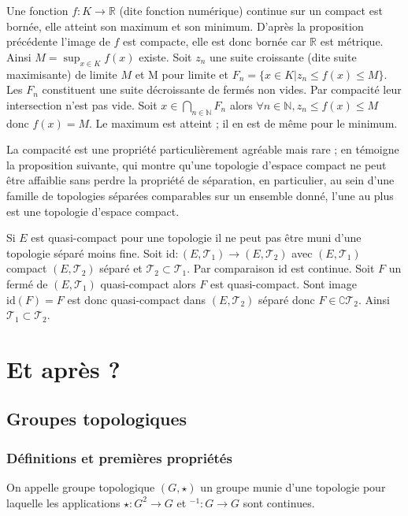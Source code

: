 \documentclass[a4paper, 11pt, french]{book}
\theoremstyle{plain} %
\theoremstyle{definition} %
\theoremstyle{remark} %
\newcommand{\1}{\mathds{1}}
\newcommand{\id}{\mathrm{id}}
\newcommand{\infegal}{\leqslant}
\newcommand{\inv}[1]{#1^{-1}}
\newcommand{\N}{\mathbb{N}}
\newcommand{\R}{\mathbb{R}}
\begin{document}
\proposition
Une fonction $f:K\rightarrow\R$ (dite fonction numérique) continue sur un compact est bornée, elle atteint son maximum et son minimum.
\demonstration
D’après la proposition précédente l’image de $f$ est compacte, elle est donc bornée car $\R$ est métrique.
Ainsi $M=\sup_{x\in K}f(x)$ existe.
Soit $z_n$ une suite croissante (dite suite maximisante) de limite $M$ et  M pour limite et $F_n=\{x\in K | z_n\infegal f(x)\infegal M\}$.
Les $F_n$ constituent une suite décroissante de fermés non vides.
Par compacité leur intersection n’est pas vide.
Soit $x\in\bigcap_{n\in\N}F_n$ alors $\forall n\in\N, z_n\infegal f(x)\infegal M$ donc $f(x)=M$.
Le maximum est atteint ; il en est de même pour le minimum.

\remarque
La compacité est une propriété particulièrement agréable mais rare ; en témoigne la proposition suivante, qui montre qu’une topologie d’espace compact ne peut être affaiblie sans perdre la propriété de séparation, en particulier, au sein d’une famille de topologies séparées comparables sur un ensemble donné, l’une au plus est une topologie d’espace compact.

\proposition
Si $E$ est quasi-compact pour une topologie il ne peut pas être muni d’une topologie séparé moins fine.
\demonstration
Soit $\id:(E, \mathscr{T}_1)\rightarrow(E, \mathscr{T}_2)$ avec $(E, \mathscr{T}_1)$ compact $(E, \mathscr{T}_2)$ séparé et $\mathscr{T}_2\subset\mathscr{T}_1$.
Par comparaison $\id$ est continue.
Soit $F$ un fermé de $(E, \mathscr{T}_1)$ quasi-compact alors $F$ est quasi-compact.
Sont image $\id(F)=F$ est donc quasi-compact dans $(E, \mathscr{T}_2)$ séparé donc $F\in\complement\mathscr{T}_2$.
Ainsi $\mathscr{T}_1\subset\mathscr{T}_2$.

\part{Et après ?}

\chapter{Groupes topologiques}

\section{Définitions et premières propriétés}

On appelle groupe topologique $(G, \star)$ un groupe munie d'une topologie pour laquelle les applications $\star:G^2\rightarrow G$ et $\inv{}:G\rightarrow G$ sont continues.
\end{document}

